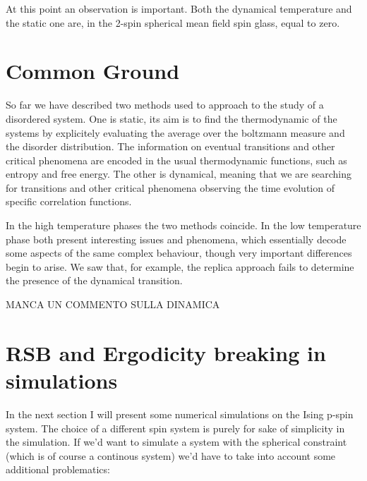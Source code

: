 \documentclass{article}
\begin{document}
At this point an observation is important. Both the dynamical temperature and the static one are,
 in the 2-spin spherical mean field spin glass, equal to zero.


\section{Common Ground}

So far we have described two methods used to approach to the study of a
disordered system. One is static, its aim is to find the thermodynamic of the
systems by explicitely evaluating the average over the boltzmann measure and
the disorder distribution. The information on eventual transitions and other
critical phenomena are encoded in the usual thermodynamic functions, such as
entropy and free energy. The other is dynamical, meaning that we are searching
for transitions and other critical phenomena observing the time evolution of
specific correlation functions.

In the high temperature phases the two methods coincide. In the low temperature phase both present
interesting issues and phenomena, which essentially decode some aspects of the same complex behaviour, 
though very important differences begin to arise. We saw that, for example, the replica approach fails to determine the 
presence of the dynamical transition.

MANCA UN COMMENTO SULLA DINAMICA

\section{RSB and Ergodicity breaking in simulations}

In the next section I will present some numerical simulations on the Ising p-spin system. 
The choice of a different spin system is purely for sake of simplicity in the simulation.
If we'd want to simulate a system with the spherical constraint (which is of course a continous system)
we'd have to take into account some additional problematics: 
\end{document}
